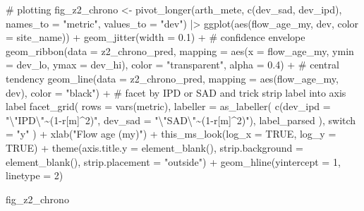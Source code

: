 \documentclass[
  letterpaper,
  DIV=11,
  numbers=noendperiod]{scrartcl}
\newenvironment{Shaded}{\begin{snugshade}}{\end{snugshade}}
\newcommand{\AttributeTok}[1]{\textcolor[rgb]{0.40,0.45,0.13}{#1}}
\newcommand{\CommentTok}[1]{\textcolor[rgb]{0.37,0.37,0.37}{#1}}
\newcommand{\ConstantTok}[1]{\textcolor[rgb]{0.56,0.35,0.01}{#1}}
\newcommand{\DecValTok}[1]{\textcolor[rgb]{0.68,0.00,0.00}{#1}}
\newcommand{\FloatTok}[1]{\textcolor[rgb]{0.68,0.00,0.00}{#1}}
\newcommand{\FunctionTok}[1]{\textcolor[rgb]{0.28,0.35,0.67}{#1}}
\newcommand{\NormalTok}[1]{\textcolor[rgb]{0.00,0.23,0.31}{#1}}
\newcommand{\OtherTok}[1]{\textcolor[rgb]{0.00,0.23,0.31}{#1}}
\newcommand{\SpecialCharTok}[1]{\textcolor[rgb]{0.37,0.37,0.37}{#1}}
\newcommand{\StringTok}[1]{\textcolor[rgb]{0.13,0.47,0.30}{#1}}
\begin{document}
\begin{Shaded}
\begin{Highlighting}[]
\CommentTok{\# plotting}
\NormalTok{fig\_z2\_chrono }\OtherTok{\textless{}{-}} \FunctionTok{pivot\_longer}\NormalTok{(arth\_mete, }\FunctionTok{c}\NormalTok{(dev\_sad, dev\_ipd), }
             \AttributeTok{names\_to =} \StringTok{"metric"}\NormalTok{, }\AttributeTok{values\_to =} \StringTok{"dev"}\NormalTok{) }\SpecialCharTok{|\textgreater{}} 
    \FunctionTok{ggplot}\NormalTok{(}\FunctionTok{aes}\NormalTok{(flow\_age\_my, dev, }\AttributeTok{color =}\NormalTok{ site\_name)) }\SpecialCharTok{+}
    \FunctionTok{geom\_jitter}\NormalTok{(}\AttributeTok{width =} \FloatTok{0.1}\NormalTok{) }\SpecialCharTok{+}
    \CommentTok{\# confidence envelope }
    \FunctionTok{geom\_ribbon}\NormalTok{(}\AttributeTok{data =}\NormalTok{ z2\_chrono\_pred, }
                \AttributeTok{mapping =} \FunctionTok{aes}\NormalTok{(}\AttributeTok{x =}\NormalTok{ flow\_age\_my, }
                              \AttributeTok{ymin =}\NormalTok{ dev\_lo, }
                              \AttributeTok{ymax =}\NormalTok{ dev\_hi), }
                \AttributeTok{color =} \StringTok{"transparent"}\NormalTok{, }\AttributeTok{alpha =} \FloatTok{0.4}\NormalTok{) }\SpecialCharTok{+}
    \CommentTok{\# central tendency }
    \FunctionTok{geom\_line}\NormalTok{(}\AttributeTok{data =}\NormalTok{ z2\_chrono\_pred, }
              \AttributeTok{mapping =} \FunctionTok{aes}\NormalTok{(flow\_age\_my, dev), }
              \AttributeTok{color =} \StringTok{"black"}\NormalTok{) }\SpecialCharTok{+}
    \CommentTok{\# facet by IPD or SAD and trick strip label into axis label}
    \FunctionTok{facet\_grid}\NormalTok{(}
        \AttributeTok{rows =} \FunctionTok{vars}\NormalTok{(metric), }
        \AttributeTok{labeller =} \FunctionTok{as\_labeller}\NormalTok{(}
            \FunctionTok{c}\NormalTok{(}\AttributeTok{dev\_ipd =} \StringTok{"}\SpecialCharTok{\textbackslash{}"}\StringTok{IPD}\SpecialCharTok{\textbackslash{}"}\StringTok{\textasciitilde{}(1{-}r[m]\^{}2)"}\NormalTok{, }
              \AttributeTok{dev\_sad =} \StringTok{"}\SpecialCharTok{\textbackslash{}"}\StringTok{SAD}\SpecialCharTok{\textbackslash{}"}\StringTok{\textasciitilde{}(1{-}r[m]\^{}2)"}\NormalTok{),}
\NormalTok{            label\_parsed}
\NormalTok{        ), }
        \AttributeTok{switch =} \StringTok{"y"}
\NormalTok{    ) }\SpecialCharTok{+}
    \FunctionTok{xlab}\NormalTok{(}\StringTok{"Flow age (my)"}\NormalTok{) }\SpecialCharTok{+}
    \FunctionTok{this\_ms\_look}\NormalTok{(}\AttributeTok{log\_x =} \ConstantTok{TRUE}\NormalTok{, }\AttributeTok{log\_y =} \ConstantTok{TRUE}\NormalTok{) }\SpecialCharTok{+}
    \FunctionTok{theme}\NormalTok{(}\AttributeTok{axis.title.y =} \FunctionTok{element\_blank}\NormalTok{(),}
          \AttributeTok{strip.background =} \FunctionTok{element\_blank}\NormalTok{(), }
          \AttributeTok{strip.placement =} \StringTok{"outside"}\NormalTok{) }\SpecialCharTok{+}
    \FunctionTok{geom\_hline}\NormalTok{(}\AttributeTok{yintercept =} \DecValTok{1}\NormalTok{, }\AttributeTok{linetype =} \DecValTok{2}\NormalTok{)}

\NormalTok{fig\_z2\_chrono }
\end{Highlighting}
\end{Shaded}
\end{document}
